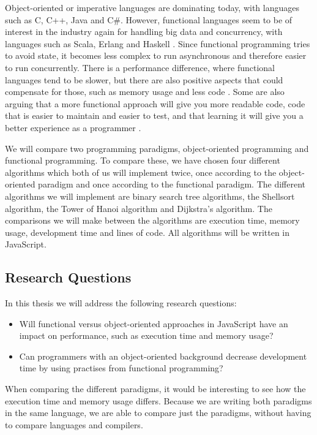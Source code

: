 \documentclass {article}
\begin{document}
Object-oriented or imperative languages are dominating today, with languages such as C, C++, Java and C\#. However, functional languages seem to be of interest in the industry again for handling big data and concurrency, with languages such as Scala, Erlang and Haskell \cite{drboolean, eriksen, erikarl}. Since functional programming tries to avoid state, it becomes less complex to run asynchronous and therefore easier to run concurrently. There is a performance difference, where functional languages tend to be slower, but there are also positive aspects that could compensate for those, such as memory usage and less code \cite{fogus, alomgi}.  Some are also arguing that a more functional approach will give you more readable code, code that is easier to maintain and easier to test, and that learning it will give you a better experience as a programmer \cite{drboolean, meijer}. 

We will compare two programming paradigms, object-oriented programming and functional programming. To compare these, we have chosen four different algorithms which both of us will implement twice, once according to the object-oriented paradigm and once according to the functional paradigm. The different algorithms we will implement are binary search tree algorithms, the Shellsort algorithm, the Tower of Hanoi algorithm and Dijkstra's algorithm. The comparisons we will make between the algorithms are execution time, memory usage, development time and lines of code. All algorithms will be written in JavaScript.
\subsection{Research Questions}
In this thesis we will address the following research questions:
\begin{itemize}
\item Will functional versus object-oriented approaches in JavaScript have an impact on performance, such as execution time and memory usage?
\item Can programmers with an object-oriented background decrease development time by using practises from functional programming?
\end{itemize}

When comparing the different paradigms, it would be interesting to see how the execution time and memory usage differs. Because we are writing both paradigms in the same language, we are able to compare just the paradigms, without having to compare languages and compilers.
\end{document}
